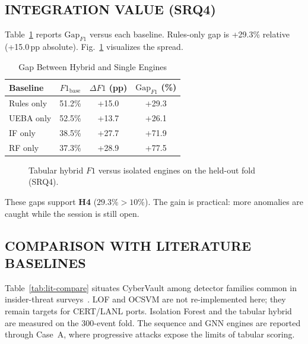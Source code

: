 \documentclass{ieeeaccess}
\begin{document}
\subsection{INTEGRATION VALUE (SRQ4)}
Table~\ref{tab:gap-matrix} reports $\mathrm{Gap}_{F1}$ versus each baseline. Rules-only gap is +29.3\% relative (+15.0\,pp absolute). Fig.~\ref{fig:integration} visualizes the spread.

\begin{table}[!t]
\caption{Gap Between Hybrid and Single Engines}
\label{tab:gap-matrix}
\centering
\scriptsize
\begin{tabular}{@{}lccc@{}}
\toprule
\textbf{Baseline} & $F1_{\mathrm{base}}$ & $\Delta F1$ (pp) & $\mathrm{Gap}_{F1}$ (\%) \\
\midrule
Rules only & 51.2\% & +15.0 & +29.3 \\
UEBA only & 52.5\% & +13.7 & +26.1 \\
IF only & 38.5\% & +27.7 & +71.9 \\
RF only & 37.3\% & +28.9 & +77.5 \\
\bottomrule
\end{tabular}
\end{table}

\begin{figure}[!t]
\centering
{}
\caption{Tabular hybrid $F1$ versus isolated engines on the held-out fold (SRQ4).}
\label{fig:integration}
\end{figure}

These gaps support \textbf{H4} ($29.3\% > 10\%$). The gain is practical: more anomalies are caught while the session is still open.

\subsection{COMPARISON WITH LITERATURE BASELINES}
Table~\ref{tab:lit-compare} situates CyberVault among detector families common in insider-threat surveys~\cite{ref6,ref24}. LOF and OCSVM are not re-implemented here; they remain targets for CERT/LANL ports. Isolation Forest and the tabular hybrid are measured on the 300-event fold. The sequence and GNN engines are reported through Case~A, where progressive attacks expose the limits of tabular scoring.
\end{document}
